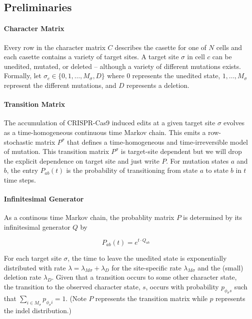 \documentclass{article}
\begin{document}
\subsection{Preliminaries}

\paragraph*{Character Matrix} Every row in the character matrix $C$ describes the casette for one of $N$ cells and each casette contains a variety of target sites. A target site $\sigma$ in cell $c$ can be unedited, mutated, or deleted -- although a variety of different mutations exists. Formally, let $\sigma_c \in \{0, 1, \ldots, M_\sigma, D \}$ where $0$ represents the unedited state, $1, \ldots, M_\sigma$ represent the different mutations, and $D$ represents a deletion.

\paragraph*{Transition Matrix} The accumulation of CRISPR-Cas9 induced edits at a given target site $\sigma$ evolves as a time-homogeneous continuous time Markov chain. This emits a row-stochastic matrix $P^\sigma$ that defines a time-homogeneous and time-irreversible model of mutation. This transition matrix $P^\sigma$ is target-site dependent but we will drop the explicit dependence on target site and just write $P$. For mutation states $a$ and $b$, the entry $P_{ab}(t)$ is the probability of transitioning from state $a$ to state $b$ in $t$ time steps.

\paragraph*{Infinitesimal Generator} As a continous time Markov chain, the probablity matrix $P$ is determined by its infinitesimal generator $Q$ by

\begin{equation}
  P_{ab}(t) = e^{t \cdot Q_{ab}}
\end{equation}

For each target site $\sigma$, the time to leave the unedited state is exponentially distributed with rate $\lambda=\lambda_{M \sigma} + \lambda_D$ for the site-specific rate $\lambda_{M \sigma}$ and the (small) deletion rate $\lambda_D$. Given that a transition occurs to some other character state, the transition to the observed character state, $s$, occurs with probability $p_{\phi_\sigma s}$ such that $\sum_{i \in M_\sigma} p_{\phi_\sigma i} = 1$. (Note $P$ represents the transition matrix while $p$ represents the indel distribution.)
\end{document}

